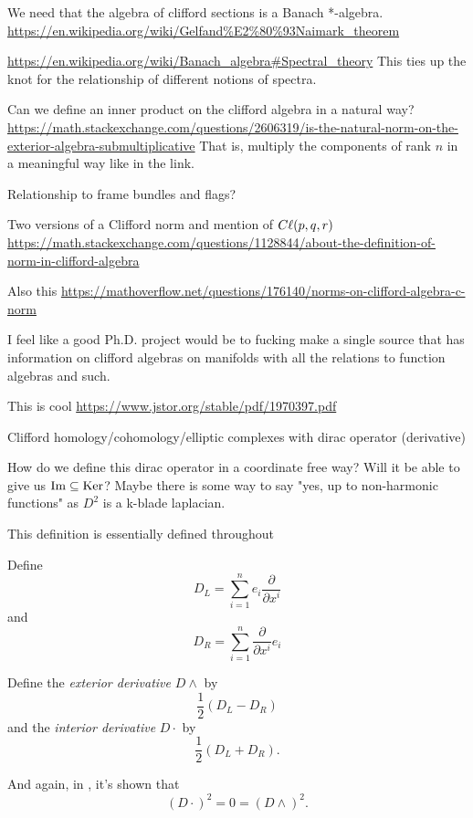 We need that the algebra of clifford sections is a Banach *-algebra.
\url{https://en.wikipedia.org/wiki/Gelfand%E2%80%93Naimark_theorem}

\url{https://en.wikipedia.org/wiki/Banach_algebra#Spectral_theory} This ties up the knot for the relationship of different notions of spectra.

Can we define an inner product on the clifford algebra in a natural way? \url{https://math.stackexchange.com/questions/2606319/is-the-natural-norm-on-the-exterior-algebra-submultiplicative} That is, multiply the components of rank $n$ in a meaningful way like in the link.

Relationship to frame bundles and flags?

Two versions of a Clifford norm and mention of $C\ell (p,q,r)$ \url{https://math.stackexchange.com/questions/1128844/about-the-definition-of-norm-in-clifford-algebra}

Also this
\url{https://mathoverflow.net/questions/176140/norms-on-clifford-algebra-c-norm}

I feel like a good Ph.D. project would be to fucking make a single source that has information on clifford algebras on manifolds with all the relations to function algebras and such.

This is cool \url{https://www.jstor.org/stable/pdf/1970397.pdf}

Clifford homology/cohomology/elliptic complexes with dirac operator (derivative)

How do we define this dirac operator in a coordinate free way? Will it be able to give us $\mathrm{Im} \subseteq \mathrm{Ker}$? Maybe there is some way to say "yes, up to non-harmonic functions" as $D^2$ is a k-blade laplacian.

This definition is essentially defined throughout \cite{geometric_algebra_physicists}

\begin{definition}
Define
\[
D_L = \sum_{i=1}^n e_i \frac{\partial}{\partial x^i}
\]
and
\[
D_R = \sum_{i=1}^n \frac{\partial}{\partial x^i} e_i
\]
\end{definition}

\begin{definition}
Define the \emph{exterior derivative} $D\wedge$ by
\[
\frac{1}{2}\left(D_L - D_R\right)
\]
and the \emph{interior derivative} $D\cdot$ by
\[
\frac{1}{2}\left(D_L+D_R\right).
\]
\end{definition}

And again, in \cite{geometric_algebra_physicists}, it's shown that
\[
(D\cdot)^2 = 0 = (D\wedge)^2.
\]

